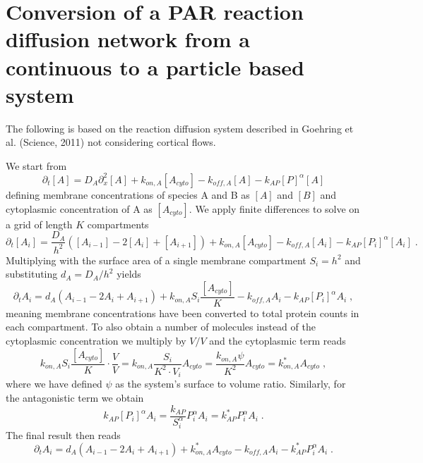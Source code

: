\documentclass[a4paper,oneside,12pt]{article}
\begin{document}
\pagestyle{empty}%
\setcounter{page}{1}
\section*{Conversion of a PAR reaction diffusion network from a continuous to a particle based system}
The following is based on the reaction diffusion system described in Goehring et al. (Science, 2011) not considering cortical flows.

We start from 
\begin{equation}
\partial_t[A]=D_A\partial_x^{2}[A] + k_{on,A}[A_{cyto}] - k_{off,A}[A] -k_{AP}[P]^{\alpha}[A]
\end{equation}
defining membrane concentrations of species A and B as $[A]$ and $[B]$ and cytoplasmic concentration of A as $[A_{cyto}]$. We apply finite differences to solve on a grid of length $K$ compartments
\begin{equation}
\partial_t[A_i]=\frac{D_A}{h^2}([A_{i-1}] - 2[A_i] + [A_{i+1}]) + k_{on,A}[A_{cyto}] - k_{off,A}[A_i] -k_{AP}[P_i]^{\alpha}[A_i] \;.
\end{equation} 
Multiplying with the surface area of a single membrane compartment $S_i = h^2$ and substituting $d_A = D_A/h^2$ yields
\begin{equation}
\partial_t A_i=d_A(A_{i-1} - 2A_i + A_{i+1}) + k_{on,A}S_i\frac{[A_{cyto}]}{K}- k_{off,A}A_i -k_{AP}[P_i]^{\alpha}A_i \;,
\end{equation} 
meaning membrane concentrations have been converted to total protein counts in each compartment. To also obtain a number of molecules instead of the cytoplasmic concentration we multiply by $V/V$ and the cytoplasmic term reads 
\begin{equation}
k_{on,A}S_i\frac{[A_{cyto}]}{K} \cdot \frac{V}{V} =  k_{on,A}\frac{S_i}{K^2\cdot V_i}A_{cyto} = \frac{k_{on,A}\psi}{K^2}A_{cyto} = k_{on,A}^*A_{cyto}\;,
\end{equation}
where we have defined $\psi$ as the system's surface to volume ratio. Similarly, for the antagonistic term we obtain 
\begin{equation}
k_{AP}[P_i]^{\alpha}A_i = \frac{k_{AP}}{S_i^\alpha}P_i^{\alpha}A_i=k_{AP}^*P_i^{\alpha}A_i\;.
\end{equation}
The final result then reads
\begin{equation}
\partial_t A_i=d_A(A_{i-1} - 2A_i + A_{i+1}) + k_{on,A}^*A_{cyto}- k_{off,A}A_i -k_{AP}^*P_i^{\alpha}A_i \;.
\end{equation}
\end{document}
